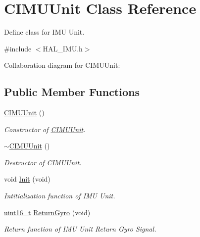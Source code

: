 \hypertarget{class_c_i_m_u_unit}{}\section{C\+I\+M\+U\+Unit Class Reference}
\label{class_c_i_m_u_unit}


Define class for I\+MU Unit.  




{\ttfamily \#include $<$H\+A\+L\+\_\+\+I\+M\+U.\+h$>$}



Collaboration diagram for C\+I\+M\+U\+Unit\+:
\subsection*{Public Member Functions}
\begin{DoxyCompactItemize}
\item 
\mbox{\hyperlink{class_c_i_m_u_unit_a642610dac7cbec756f3ef51c5d77c344}{C\+I\+M\+U\+Unit}} ()
\begin{DoxyCompactList}\small\item\em Constructor of \mbox{\hyperlink{class_c_i_m_u_unit}{C\+I\+M\+U\+Unit}}. \end{DoxyCompactList}\item 
\mbox{\hyperlink{class_c_i_m_u_unit_ad1b0755d9d3f7f25abc660562eba6dfa}{$\sim$\+C\+I\+M\+U\+Unit}} ()
\begin{DoxyCompactList}\small\item\em Destructor of \mbox{\hyperlink{class_c_i_m_u_unit}{C\+I\+M\+U\+Unit}}. \end{DoxyCompactList}\item 
void \mbox{\hyperlink{class_c_i_m_u_unit_a589ccc2afbaadbdf9dbef34c5025a42f}{Init}} (void)
\begin{DoxyCompactList}\small\item\em Intitialization function of I\+MU Unit. \end{DoxyCompactList}\item 
\mbox{\hyperlink{_a_d_a_s___types_8h_a1f1825b69244eb3ad2c7165ddc99c956}{uint16\+\_\+t}} \mbox{\hyperlink{class_c_i_m_u_unit_a396b045fac007e169289409ca213ac39}{Return\+Gyro}} (void)
\begin{DoxyCompactList}\small\item\em Return function of I\+MU Unit Return Gyro Signal. \end{DoxyCompactList}\end{DoxyCompactItemize}


